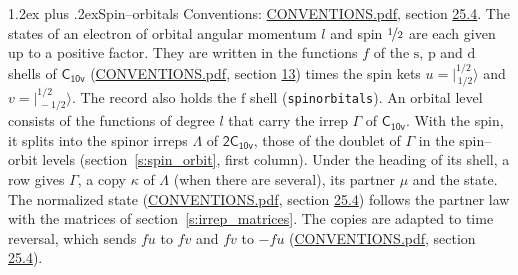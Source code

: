 \documentclass[10pt,a4paper]{article}
\makeatletter
\renewcommand\section{\@startsection{section}{1}{\z@}{-3ex plus -1ex minus -.2ex}%
  {1.2ex plus .2ex}{\normalfont\large\sffamily\bfseries\color{parttitle}}}
\numberwithin{equation}{section}
\newcommand{\grp}[1]{\mathsf{#1}}
\newcommand{\orbital}[1]{\mathrm{#1}}
\newcommand{\mult}{\kappa}
\newcommand{\intx}{\mu}
\newcommand{\jm}[2]{\bigl\lvert{}^{#1}_{\,#2}\bigr\rangle}
\makeatother
\begin{document}
\section{Spin--orbitals}\label{s:spin_orbitals}
Conventions: \href{../../CONVENTIONS.pdf}{CONVENTIONS.pdf}, section \href{../../CONVENTIONS.pdf\#conv.25.4}{25.4}.
\leavevmode\label{n:index.orbital.l}The states of an electron of orbital angular momentum $l$ and spin $\nicefrac{1}{2}$ are each given up to a positive factor. \label{n:local.spinor.uv}\label{n:local.function.f}They are written in the functions $f$ of the $\orbital{s}$, $\orbital{p}$ and $\orbital{d}$ shells of \href{../../../rotation/data/pdf/C10v.pdf}{$\grp{C_{10v}}$} (\href{../../CONVENTIONS.pdf}{CONVENTIONS.pdf}, section \href{../../../rotation/CONVENTIONS.pdf\#conv.13}{13}) times the spin kets $u = \jm{1/2}{1/2}$ and $v = \jm{1/2}{-1/2}$. The record also holds the $\orbital{f}$ shell (\texttt{spinorbitals}). An orbital level consists of the functions of degree $l$ that carry the irrep $\Gamma$ of \href{../../../rotation/data/pdf/C10v.pdf}{$\grp{C_{10v}}$}. With the spin, it splits into the spinor irreps $\Lambda$ of $\grp{2C_{10v}}$, those of the doublet of $\Gamma$ in the spin--orbit levels (section~\ref{s:spin_orbit}, first column). \label{n:head.state}Under the heading of its shell, a row gives $\Gamma$, a copy $\mult$ of $\Lambda$ (when there are several), its partner $\intx$ and the state. The normalized state (\href{../../CONVENTIONS.pdf}{CONVENTIONS.pdf}, section \href{../../CONVENTIONS.pdf\#conv.25.4}{25.4}) follows the partner law with the matrices of section~\ref{s:irrep_matrices}. The copies are adapted to time reversal, which sends $f u$ to $f v$ and $f v$ to $-f u$ (\href{../../CONVENTIONS.pdf}{CONVENTIONS.pdf}, section \href{../../CONVENTIONS.pdf\#conv.25.4}{25.4}).
\end{document}
